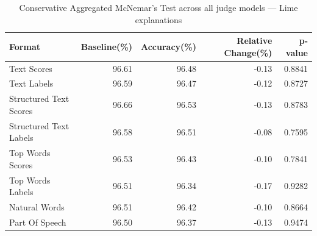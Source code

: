 \begin{table}[htbp]
\centering
\small
\caption{Conservative Aggregated McNemar's Test across all judge models --- Lime explanations}
\label{tab:conservative-aggregated-lime-all-models}
\begin{tabular}{lrrrr}
\toprule
Format & Baseline(\%) & Accuracy(\%) & Relative Change(\%) & p-value \\
\midrule
Text Scores & 96.61 & 96.48 & -0.13 & 0.8841 \\
Text Labels & 96.59 & 96.47 & -0.12 & 0.8727 \\
Structured Text Scores & 96.66 & 96.53 & -0.13 & 0.8783 \\
Structured Text Labels & 96.58 & 96.51 & -0.08 & 0.7595 \\
Top Words Scores & 96.53 & 96.43 & -0.10 & 0.7841 \\
Top Words Labels & 96.51 & 96.34 & -0.17 & 0.9282 \\
Natural Words & 96.51 & 96.42 & -0.10 & 0.8664 \\
Part Of Speech & 96.50 & 96.37 & -0.13 & 0.9474 \\
\bottomrule
\end{tabular}
\end{table}